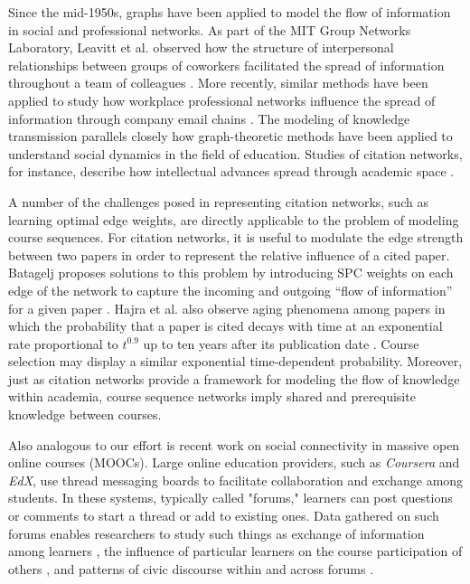 Since the mid-1950s, graphs have been applied to model the flow of information in social and professional networks. As part of the MIT Group Networks Laboratory, Leavitt et al. observed how the structure of interpersonal relationships between groups of coworkers facilitated the spread of information throughout a team of colleagues \cite{Leavitt1951}. More recently, similar methods have been applied to study how workplace professional networks influence the spread of information through company email chains \cite{Fisher2004}. The modeling of knowledge transmission parallels closely how graph-theoretic methods have been applied to understand social dynamics in the field of education. Studies of citation networks, for instance, describe how intellectual advances spread through academic space \cite{Batagelj2003, Garfield1964}. 



A number of the challenges posed in representing citation networks, such as learning optimal edge weights, are directly applicable to the problem of modeling course sequences. For citation networks, it is useful to modulate the edge strength between two papers in order to represent the relative influence of a cited paper. Batagelj proposes solutions to this problem by introducing SPC weights on each edge of the network to capture the incoming and outgoing ``flow of information'' for a given paper \cite{Batagelj2003}. Hajra et al. also observe aging phenomena among papers in which the probability that a paper is cited decays with time at an exponential rate proportional to $t^{0.9}$ up to ten years after its publication date \cite{Hajra2005}. Course selection may display a similar exponential time-dependent probability. Moreover, just as citation networks provide a framework for modeling the flow of knowledge within academia, course sequence networks imply shared and prerequisite knowledge between courses. 

Also analogous to our effort is recent work on social connectivity in massive open online courses (MOOCs). Large online education providers, such as \textit{Coursera} and \textit{EdX}, use thread messaging boards to facilitate collaboration and exchange among students. In these systems, typically called "forums," learners can post questions or comments to start a thread or add to existing ones. Data gathered on such forums enables researchers to study such things as exchange of information among learners \cite{Brinton2016}, the influence of particular learners on the course participation of others \cite{Sinha2014a}, and patterns of civic discourse within and across forums \cite{reich2016civic}.

